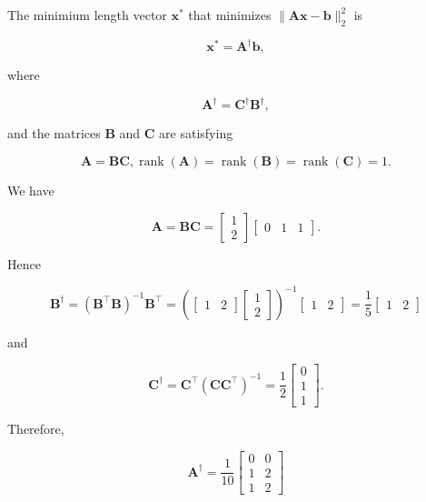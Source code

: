 The minimium length vector \(\boldsymbol{x}^{*}\) that minimizes \(\|\boldsymbol{A} \boldsymbol{x}-\boldsymbol{b}\|_{2}^{2}\) is

\[
	\boldsymbol{x}^{*}=\boldsymbol{A}^{\dagger} \boldsymbol{b},
\]

where

\[
	\boldsymbol{A}^{\dagger}=\boldsymbol{C}^{\dagger} \boldsymbol{B}^{\dagger},
\]

and the matrices \(\boldsymbol{B}\) and \(\boldsymbol{C}\) are satisfying

\[
	\boldsymbol{A}=\boldsymbol{B} \boldsymbol{C}, \operatorname{rank}(\boldsymbol{A})=\operatorname{rank}(\boldsymbol{B})=\operatorname{rank}(\boldsymbol{C})=1 .
\]

We have

\[
	\boldsymbol{A}=\boldsymbol{B} \boldsymbol{C}=\left[\begin{array}{l}
		1 \\
		2
	\end{array}\right]\left[\begin{array}{lll}
		0 & 1 & 1
	\end{array}\right].
\]

Hence

\[
	\boldsymbol{B}^{\dagger}=\left(\boldsymbol{B}^{\top} \boldsymbol{B}\right)^{-1} \boldsymbol{B}^{\top}=\left(\left[\begin{array}{ll}
		1 & 2
	\end{array}\right]\left[\begin{array}{l}
		1 \\
		2
	\end{array}\right]\right)^{-1}\left[\begin{array}{ll}
		1 & 2
	\end{array}\right]=\frac{1}{5}\left[\begin{array}{ll}
		1 & 2
	\end{array}\right]
\]

and

\[
	\boldsymbol{C}^{\dagger}=\boldsymbol{C}^{\top}\left(\boldsymbol{C} \boldsymbol{C}^{\top}\right)^{-1}=\frac{1}{2}\left[\begin{array}{l}
		0 \\
		1 \\
		1
	\end{array}\right].
\]

Therefore,

\[
	\boldsymbol{A}^{\dagger}=\frac{1}{10}\left[\begin{array}{ll}
		0 & 0 \\
		1 & 2 \\
		1 & 2
	\end{array}\right]
\]


